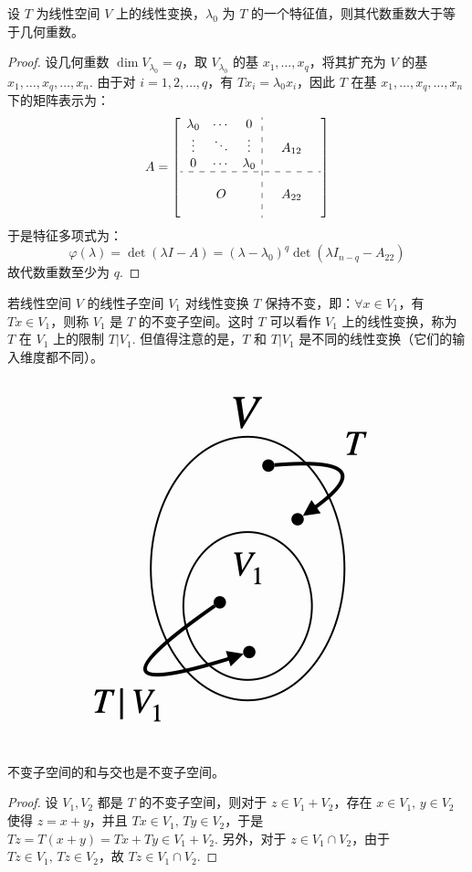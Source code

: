 \begin{theorem}
设 $T$ 为线性空间 $V$ 上的线性变换，$\lambda_0$ 为 $T$ 的一个特征值，则其代数重数大于等于几何重数。
\end{theorem}
\begin{proof}
设几何重数 $\dim V_{\lambda_0}=q$，取 $V_{\lambda_0}$ 的基 $x_1,\ldots,x_q$，将其扩充为 $V$ 的基 $x_1,\ldots,x_q,\ldots,x_n$. 由于对 $i=1,2,\ldots,q$，有 $Tx_i=\lambda_0x_i$，因此 $T$ 在基 $x_1,\ldots,x_q,\ldots,x_n$ 下的矩阵表示为：
\[
    A=\left[\begin{array}{ccc:ccc}
    \lambda_0 & \cdots & 0         & &        & \\
    \vdots    & \ddots & \vdots    & & A_{12} & \\
    0         & \cdots & \lambda_0 & &        & \\ \hdashline
              &        &           & &        & \\
              & O      &           & & A_{22} & \\
              &        &           & &        & \\
    \end{array}\right]
\]
于是特征多项式为：
\[
    \varphi(\lambda)=\det(\lambda I-A)=(\lambda-\lambda_0)^q\det(\lambda I_{n-q}-A_{22})
\]
故代数重数至少为 $q$.
\end{proof}

\begin{definition}[不变子空间]
若线性空间 $V$ 的线性子空间 $V_1$ 对线性变换 $T$ 保持不变，即：$\forall x\in V_1$，有 $Tx\in V_1$，则称 $V_1$ 是 $T$ 的不变子空间。这时 $T$ 可以看作 $V_1$ 上的线性变换，称为 $T$ 在 $V_1$ 上的限制 $T\vert V_1$.  但值得注意的是，$T$ 和 $T\vert V_1$ 是不同的线性变换（它们的输入维度都不同）。
\end{definition}
\begin{figure}[H]
    \centering
    \includegraphics[width=0.2\linewidth]{figs/TV1.png}
\end{figure}

\begin{property}
不变子空间的和与交也是不变子空间。
\end{property}
\begin{proof}
设 $V_1,V_2$ 都是 $T$ 的不变子空间，则对于 $z\in V_1+V_2$，存在 $x\in V_1,\,y\in V_2$ 使得 $z=x+y$，并且 $Tx\in V_1,\,Ty\in V_2$，于是 $Tz=T(x+y)=Tx+Ty\in V_1+V_2$. 另外，对于 $z\in V_1\cap V_2$，由于 $Tz\in V_1,\,Tz\in V_2$，故 $Tz\in V_1\cap V_2$.
\end{proof}

